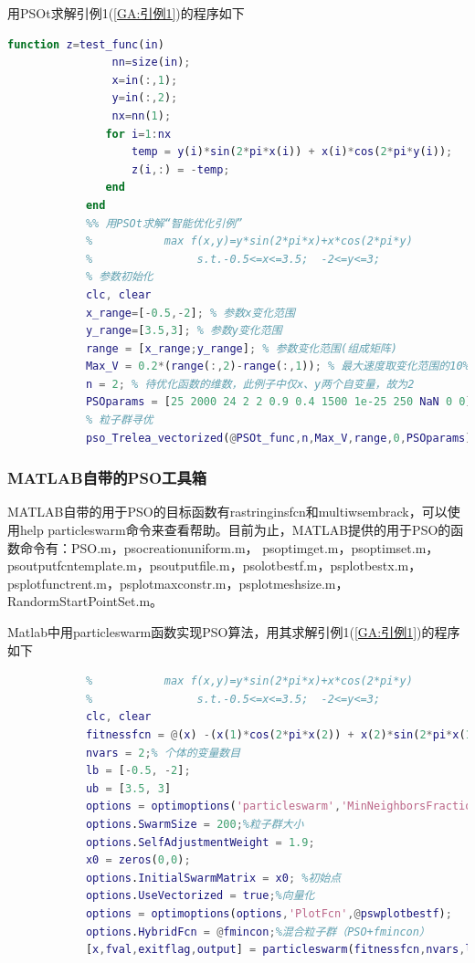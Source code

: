             \par
            用PSOt求解引例1(\ref{GA:引例1})的程序如下
            \begin{lstlisting}[language = Matlab]
            function z=test_func(in)
                nn=size(in);
                x=in(:,1);
                y=in(:,2);
                nx=nn(1);
               for i=1:nx
                   temp = y(i)*sin(2*pi*x(i)) + x(i)*cos(2*pi*y(i));
                   z(i,:) = -temp;
               end
            end
            %% 用PSOt求解“智能优化引例”
            %           max f(x,y)=y*sin(2*pi*x)+x*cos(2*pi*y)
            %                s.t.-0.5<=x<=3.5;  -2<=y<=3;
            % 参数初始化
            clc, clear
            x_range=[-0.5,-2]; % 参数x变化范围
            y_range=[3.5,3]; % 参数y变化范围
            range = [x_range;y_range]; % 参数变化范围(组成矩阵)
            Max_V = 0.2*(range(:,2)-range(:,1)); % 最大速度取变化范围的10%~20%
            n = 2; % 待优化函数的维数，此例子中仅x、y两个自变量，故为2
            PSOparams = [25 2000 24 2 2 0.9 0.4 1500 1e-25 250 NaN 0 0];
            % 粒子群寻优
            pso_Trelea_vectorized(@PSOt_func,n,Max_V,range,0,PSOparams) % 调用PSO核心模块
            \end{lstlisting}
        \subsubsection{MATLAB自带的PSO工具箱}
            \par
            MATLAB自带的用于PSO的目标函数有rastringinsfcn和multiwsembrack，可以使用help particleswarm命令来查看帮助。目前为止，MATLAB提供的用于PSO的函数命令有：PSO.m，psocreationuniform.m， psoptimget.m，psoptimset.m，psoutputfcntemplate.m，psoutputfile.m，psolotbestf.m，psplotbestx.m，psplotfunctrent.m，psplotmaxconstr.m，psplotmeshsize.m，RandormStartPointSet.m。
            \par
            Matlab中用particleswarm函数实现PSO算法，用其求解引例1(\ref{GA:引例1})的程序如下
            \begin{lstlisting}[language = Matlab]
            %% matlab自带的PSO求解“智能优化引例”
            %           max f(x,y)=y*sin(2*pi*x)+x*cos(2*pi*y)
            %                s.t.-0.5<=x<=3.5;  -2<=y<=3;
            clc, clear
            fitnessfcn = @(x) -(x(1)*cos(2*pi*x(2)) + x(2)*sin(2*pi*x(1)));% 适应度函数句柄
            nvars = 2;% 个体的变量数目
            lb = [-0.5, -2];
            ub = [3.5, 3]
            options = optimoptions('particleswarm','MinNeighborsFraction',1);
            options.SwarmSize = 200;%粒子群大小
            options.SelfAdjustmentWeight = 1.9;
            x0 = zeros(0,0);
            options.InitialSwarmMatrix = x0; %初始点
            options.UseVectorized = true;%向量化
            options = optimoptions(options,'PlotFcn',@pswplotbestf);
            options.HybridFcn = @fmincon;%混合粒子群（PSO+fmincon）
            [x,fval,exitflag,output] = particleswarm(fitnessfcn,nvars,lb,ub,options);
            \end{lstlisting}
